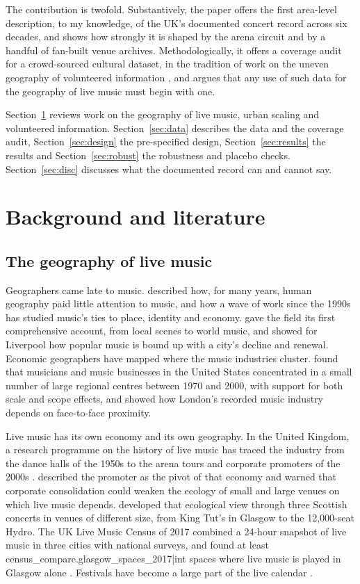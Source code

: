\documentclass[11pt,a4paper]{article}
\begin{document}
The contribution is twofold. Substantively, the paper offers the first area-level description, to my knowledge, of the UK's documented concert record across six decades, and shows how strongly it is shaped by the arena circuit and by a handful of fan-built venue archives. Methodologically, it offers a coverage audit for a crowd-sourced cultural dataset, in the tradition of work on the uneven geography of volunteered information \citep{goodchild2007,haklay2010,graham2014}, and argues that any use of such data for the geography of live music must begin with one.

Section~\ref{sec:lit} reviews work on the geography of live music, urban scaling and volunteered information. Section~\ref{sec:data} describes the data and the coverage audit, Section~\ref{sec:design} the pre-specified design, Section~\ref{sec:results} the results and Section~\ref{sec:robust} the robustness and placebo checks. Section~\ref{sec:disc} discusses what the documented record can and cannot say.

\section{Background and literature}\label{sec:lit}
\subsection{The geography of live music}
Geographers came late to music. \citet{hudson2006} described how, for many years, human geography paid little attention to music, and how a wave of work since the 1990s has studied music's ties to place, identity and economy. \citet{connell2003} gave the field its first comprehensive account, from local scenes to world music, and \citet{cohen2007} showed for Liverpool how popular music is bound up with a city's decline and renewal. Economic geographers have mapped where the music industries cluster. \citet{florida2010} found that musicians and music businesses in the United States concentrated in a small number of large regional centres between 1970 and 2000, with support for both scale and scope effects, and \citet{watson2008} showed how London's recorded music industry depends on face-to-face proximity.

Live music has its own economy and its own geography. In the United Kingdom, a research programme on the history of live music has traced the industry from the dance halls of the 1950s to the arena tours and corporate promoters of the 2000s \citep{frith2013,frith2021}. \citet{brennan2011} described the promoter as the pivot of that economy and warned that corporate consolidation could weaken the ecology of small and large venues on which live music depends. \citet{behr2016} developed that ecological view through three Scottish concerts in venues of different size, from King Tut's in Glasgow to the 12,000-seat Hydro. The UK Live Music Census of 2017 combined a 24-hour snapshot of live music in three cities with national surveys, and found at least {{census_compare.glasgow_spaces_2017|int}} spaces where live music is played in Glasgow alone \citep{webster2018}. Festivals have become a large part of the live calendar \citep{anderton2018}.
\end{document}
